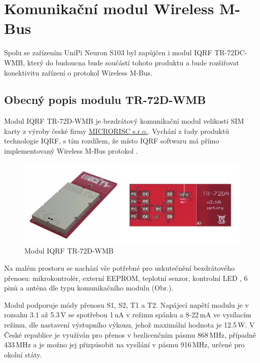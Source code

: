 \chapter{Komunikační modul Wireless M-Bus}

Spolu se zařízením UniPi Neuron S103 byl zapůjčen i modul IQRF TR-72DC-WMB, který do budoucna bude součástí tohoto produktu a bude rozšiřovat konektivitu zařízení o protokol Wireless M-Bus. 

\section{Obecný popis modulu TR-72D-WMB}

Modul IQRF TR-72D-WMB je bezdrátový komunikační modul velikosti SIM karty z výroby české firmy \href{http://microrisc.com/cs/}{MICRORISC s.r.o.}. Vychází z řady produktů technologie IQRF, s tím rozdílem, že místo IQRF softwaru má přímo implementovaný Wireless M-Bus protokol \cite{iqrfmodul}. 

 \begin{figure}[!h]
  \begin{center}
    \includegraphics[scale=0.6]{obrazky/modul_modul}
  \end{center}
  \caption{Modul IQRF TR-72D-WMB \cite{iqrfmodul}}
\end{figure}

Na malém prostoru se nachází vše potřebné pro uskutečnění bezdrátového přenosu: mikrokontrolér, externí EEPROM, teplotní senzor, kontrolní LED , 6 pinů a anténa dle typu komunikačního modulu (Obr.\label{BlokovkaIQRF}).



Modul podporuje módy přenosu S1, S2, T1 a T2. Napájecí napětí modulu je v rozsahu 3.1 až 5.3\,V se spotřebou 1\,uA v režimu spánku a 8-22\,mA ve vysílacím režimu, dle nastavení výstupního výkonu, jehož maximální hodnota je 12.5\,W.
V České republice je využíván pro přenos v bezlicenčním pásmu 868\,MHz, případně 433\,MHz a je možno jej přizpůsobit na vysílání v pásmu 916\,MHz, určené pro okolní státy.\newline

